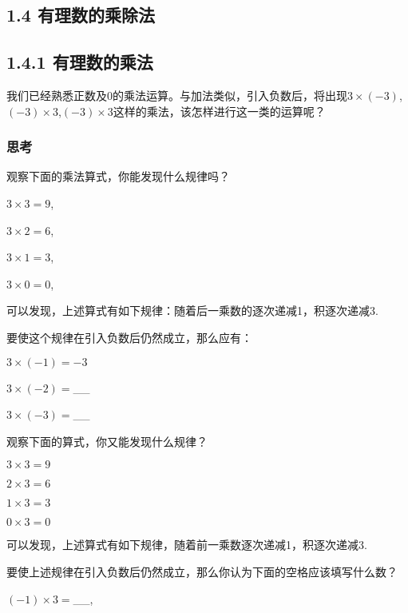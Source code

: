\documentclass{article}
\begin{document}
\begin{article}

\section{1.4 有理数的乘除法}

\subsection{1.4.1 有理数的乘法}

我们已经熟悉正数及0的乘法运算。与加法类似，引入负数后，将出现${3}\times{(-3)}$,
${(-3)}\times{3}$,${(-3)\times{3}}$这样的乘法，该怎样进行这一类的运算呢？

\begin{example}

\subsubsection{思考}

观察下面的乘法算式，你能发现什么规律吗？

$3\times3=9$,

$3\times2=6$,

$3\times1=3$,

$3\times0=0$,

\end{example}

可以发现，上述算式有如下规律：随着后一乘数的逐次递减1，积逐次递减3.

要使这个规律在引入负数后仍然成立，那么应有：

$3\times(-1)=-3$

$3\times(-2)=$__

$3\times(-3)=$__

\begin{example}

观察下面的算式，你又能发现什么规律？

$3\times3=9$

$2\times3=6$

$1\times3=3$

$0\times3=0$

\end{example}

可以发现，上述算式有如下规律，随着前一乘数逐次递减1，积逐次递减3.

要使上述规律在引入负数后仍然成立，那么你认为下面的空格应该填写什么数？

$(-1)\times3=$__,


\end{article}
\end{document}
